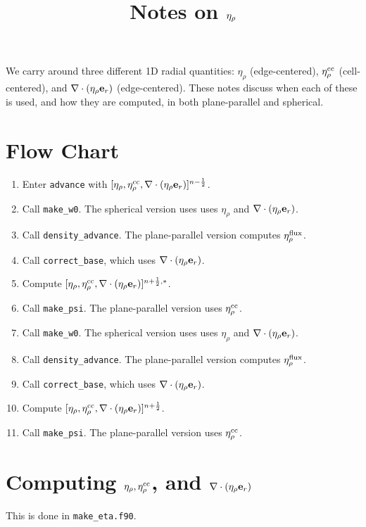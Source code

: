 \documentclass[11pt]{article}
\title{Notes on $\etarho$}
\def\half   {\frac{1}{2}}
\def\eb         {{\bf e}}
\def\etarho     {\eta_\rho}
\def\etarhocc   {\etarho^{\rm cc}}
\def\etarhoflux {\etarho^{\rm flux}}
\def\divetarho  {\nabla\cdot(\etarho\eb_r)}
\begin{document}
\maketitle
\tableofcontents
\clearpage

We carry around three different 1D radial quantities: $\etarho$ (edge-centered), $\etarhocc$ (cell-centered), and $\divetarho$ (edge-centered).  These notes discuss when each of these is used, and how they are computed, in both plane-parallel and spherical.

\section{Flow Chart}
\begin{enumerate}
\item Enter {\tt advance} with $[\etarho, \etarhocc, \divetarho]^{n-\half}$.
\item Call {\tt make\_w0}.  The spherical version uses uses $\etarho$ and $\divetarho$.
\item Call {\tt density\_advance}.  The plane-parallel version computes $\etarhoflux$.
\item Call {\tt correct\_base}, which uses $\divetarho$.
\item Compute $[\etarho, \etarhocc, \divetarho]^{n+\half,*}$.
\item Call {\tt make\_psi}.  The plane-parallel version uses $\etarhocc$.
\item Call {\tt make\_w0}.  The spherical version uses uses $\etarho$ and $\divetarho$.
\item Call {\tt density\_advance}.  The plane-parallel version computes $\etarhoflux$.
\item Call {\tt correct\_base}, which uses $\divetarho$.
\item Compute $[\etarho, \etarhocc, \divetarho]^{n+\half}$.
\item Call {\tt make\_psi}.  The plane-parallel version uses $\etarhocc$.
\end{enumerate}

\section{Computing $\etarho, \etarhocc$, and $\divetarho$}
This is done in {\tt make\_eta.f90}.
\end{document}
